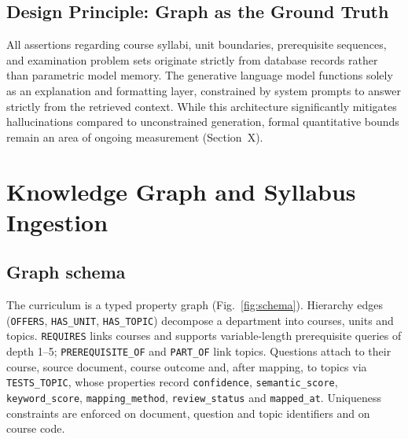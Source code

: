 \documentclass[conference]{IEEEtran}
\newcommand{\code}[1]{\texttt{\small #1}}
\begin{document}
\subsection{Design Principle: Graph as the Ground Truth}
All assertions regarding course syllabi, unit boundaries, prerequisite sequences, and examination problem sets originate strictly from database records rather than parametric model memory. The generative language model functions solely as an explanation and formatting layer, constrained by system prompts to answer strictly from the retrieved context. While this architecture significantly mitigates hallucinations compared to unconstrained generation, formal quantitative bounds remain an area of ongoing measurement (Section~X).


\section{Knowledge Graph and Syllabus Ingestion}\label{sec:kg}
\subsection{Graph schema}
The curriculum is a typed property graph (Fig.~\ref{fig:schema}). Hierarchy edges (\code{OFFERS}, \code{HAS\_UNIT}, \code{HAS\_TOPIC}) decompose a department into courses, units and topics. \code{REQUIRES} links courses and supports variable-length prerequisite queries of depth 1--5; \code{PREREQUISITE\_OF} and \code{PART\_OF} link topics. Questions attach to their course, source document, course outcome and, after mapping, to topics via \code{TESTS\_TOPIC}, whose properties record \code{confidence}, \code{semantic\_score}, \code{keyword\_score}, \code{mapping\_method}, \code{review\_status} and \code{mapped\_at}. Uniqueness constraints are enforced on document, question and topic identifiers and on course code.
\end{document}
